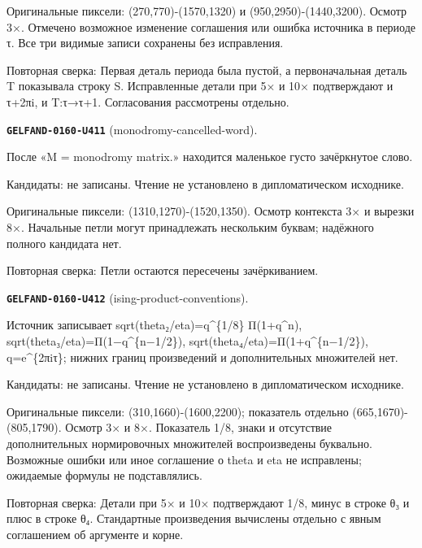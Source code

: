 Оригинальные пиксели: (270,770)-(1570,1320) и (950,2950)-(1440,3200). Осмотр 3×. Отмечено возможное изменение соглашения или ошибка источника в периоде τ. Все три видимые записи сохранены без исправления.\par
Повторная сверка: Первая деталь периода была пустой, а первоначальная деталь T показывала строку S. Исправленные детали при 5× и 10× подтверждают и τ+2πi, и T:τ→τ+1. Согласования рассмотрены отдельно.\par\medskip
\par\noindent\leavevmode{}\label{GELFAND-0160-U411}\label{GELFAND-P001481:monodromy-cancelled-word}\textbf{\texttt{GELFAND-0160-U411}} (monodromy-cancelled-word).\nopagebreak[4]\par
После «M = monodromy matrix.» находится маленькое густо зачёркнутое слово.\par
Кандидаты: не записаны. Чтение не установлено в дипломатическом исходнике.\par
Оригинальные пиксели: (1310,1270)-(1520,1350). Осмотр контекста 3× и вырезки 8×. Начальные петли могут принадлежать нескольким буквам; надёжного полного кандидата нет.\par
Повторная сверка: Петли остаются пересечены зачёркиванием.\par\medskip
\par\noindent\leavevmode{}\label{GELFAND-0160-U412}\label{GELFAND-P001481:ising-product-conventions}\textbf{\texttt{GELFAND-0160-U412}} (ising-product-conventions).\nopagebreak[4]\par
Источник записывает sqrt(theta₂/eta)=q\textasciicircum{}\{1/8\} Π(1+q\textasciicircum{}n), sqrt(theta₃/eta)=Π(1−q\textasciicircum{}\{n−1/2\}), sqrt(theta₄/eta)=Π(1+q\textasciicircum{}\{n−1/2\}), q=e\textasciicircum{}\{2πiτ\}; нижних границ произведений и дополнительных множителей нет.\par
Кандидаты: не записаны. Чтение не установлено в дипломатическом исходнике.\par
Оригинальные пиксели: (310,1660)-(1600,2200); показатель отдельно (665,1670)-(805,1790). Осмотр 3× и 8×. Показатель 1/8, знаки и отсутствие дополнительных нормировочных множителей воспроизведены буквально. Возможные ошибки или иное соглашение о theta и eta не исправлены; ожидаемые формулы не подставлялись.\par
Повторная сверка: Детали при 5× и 10× подтверждают 1/8, минус в строке θ₃ и плюс в строке θ₄. Стандартные произведения вычислены отдельно с явным соглашением об аргументе и корне.\par\medskip
